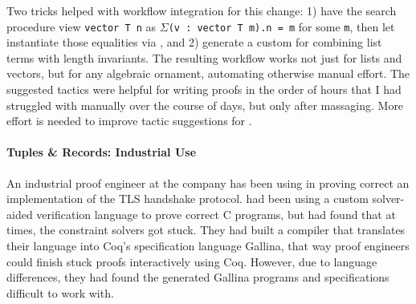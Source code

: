 Two tricks helped with workflow integration for this change:
1) have the search procedure view \lstinline{vector T n} as 
$\Sigma$\lstinline{(v : vector T m).n = m} for some \lstinline{m},
then let \toolnamec instantiate those equalities via , %
and 2) generate a custom  for combining
list terms with length invariants.
The resulting workflow works not just for lists and vectors, but for any algebraic ornament,
automating otherwise manual effort.
The suggested tactics were helpful for writing proofs in the order of hours
that I had struggled with manually over the course of days, but only after massaging.
More effort is needed to improve tactic suggestions for .

\paragraph{Tuples \& Records: Industrial Use}
An industrial proof engineer at the company \company has been using \toolnamec in proving
correct an implementation of the TLS handshake protocol.
\company had been using a custom solver-aided verification language to prove correct C programs,
but had found that at times, the constraint solvers got stuck.
They had built a compiler that translates their language into Coq's specification language Gallina,
that way proof engineers could finish stuck proofs interactively using Coq.
However, due to language differences, they had found the generated Gallina programs and specifications difficult to work with.

